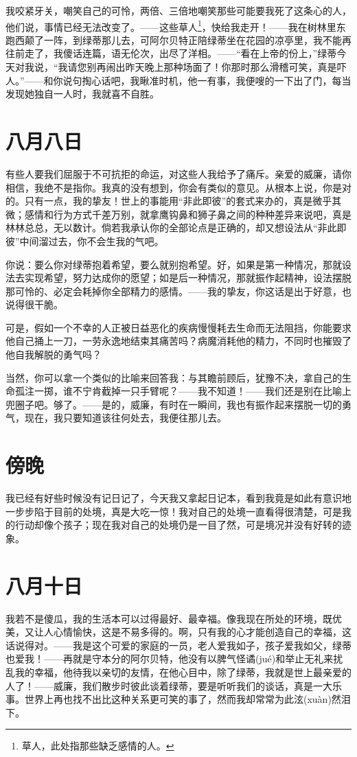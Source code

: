 \documentclass[12pt,oneside]{book}
\begin{document}
我咬紧牙关，嘲笑自己的可怜，两倍、三倍地嘲笑那些可能要我死了这条心的人，他们说，事情已经无法改变了。——这些草人\footnote{草人，此处指那些缺乏感情的人。}，快给我走开！——我在树林里东跑西颠了一阵，到绿蒂那儿去，可阿尔贝特正陪绿蒂坐在花园的凉亭里，我不能再往前走了，我傻话连篇，语无伦次，出尽了洋相。——“看在上帝的份上，”绿蒂今天对我说，“我请您别再闹出昨天晚上那种场面了！你那时那么滑稽可笑，真是吓人。”——和你说句掏心话吧，我瞅准时机，他一有事，我便嗖的一下出了门，每当发现她独自一人时，我就喜不自胜。


\chapter{八月八日}
有些人要我们屈服于不可抗拒的命运，对这些人我给予了痛斥。亲爱的威廉，请你相信，我绝不是指你。我真的没有想到，你会有类似的意见。从根本上说，你是对的。只有一点，我的挚友！世上的事能用“非此即彼”的套式来办的，真是微乎其微；感情和行为方式千差万别，就拿鹰钩鼻和狮子鼻之间的种种差异来说吧，真是林林总总，无以数计。倘若我承认你的全部论点是正确的，却又想设法从“非此即彼”中间溜过去，你不会生我的气吧。

你说：要么你对绿蒂抱着希望，要么就别抱希望。好，如果是第一种情况，那就设法去实现希望，努力达成你的愿望；如是后一种情况，那就振作起精神，设法摆脱那可怜的、必定会耗掉你全部精力的感情。——我的挚友，你这话是出于好意，也说得很干脆。

可是，假如一个不幸的人正被日益恶化的疾病慢慢耗去生命而无法阻挡，你能要求他自己捅上一刀，一劳永逸地结束其痛苦吗？病魔消耗他的精力，不同时也摧毁了他自我解脱的勇气吗？

当然，你可以拿一个类似的比喻来回答我：与其瞻前顾后，犹豫不决，拿自己的生命孤注一掷，谁不宁肯截掉一只手臂呢？——我不知道！——我们还是别在比喻上兜圈子吧。够了。——是的，威廉，有时在一瞬间，我也有振作起来摆脱一切的勇气，现在，我只要知道该往何处去，我便往那儿去。


\chapter{傍晚}
我已经有好些时候没有记日记了，今天我又拿起日记本，看到我竟是如此有意识地一步步陷于目前的处境，真是大吃一惊！我对自己的处境一直看得很清楚，可是我的行动却像个孩子；现在我对自己的处境仍是一目了然，可是境况并没有好转的迹象。
　　

\chapter{八月十日}
我若不是傻瓜，我的生活本可以过得最好、最幸福。像我现在所处的环境，既优美，又让人心情愉快，这是不易多得的。啊，只有我的心才能创造自己的幸福，这话说得对。——我是这个可爱的家庭的一员，老人爱我如子，孩子爱我如父，绿蒂也爱我！——再就是守本分的阿尔贝特，他没有以脾气怪谲(jué)和举止无礼来扰乱我的幸福，他待我以亲切的友情，在他心目中，除了绿蒂，我就是世上最亲爱的人了！——威廉，我们散步时彼此谈着绿蒂，要是听听我们的谈话，真是一大乐事。世界上再也找不出比这种关系更可笑的事了，然而我却常常为此泫(xuàn)然泪下。
\end{document}
